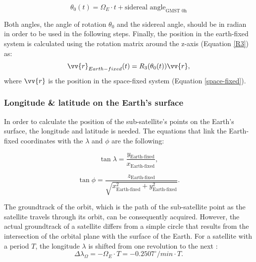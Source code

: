 
\begin{equation}
\label{theta_angle}
\theta_{0}(t) = \Omega_{E} \cdot t + \text{sidereal angle}_{\text{GMST 0h}}
\end{equation}

Both angles, the angle of rotation $\theta_{0}$ and the sidereal angle, should be in radian in order to be used in the following steps. Finally, the position in the earth-fixed system is calculated using the rotation matrix around the z-axis (Equation \ref{R3}) as:
\begin{equation}
\vv{r}_{Earth-fixed}(t) = R_{3}(\theta_{0}(t)) \vv{r},
\end{equation}
where $\vv{r}$ is the position in the space-fixed system (Equation \ref{space-fixed}).

\bigskip
\subsubsection{Longitude \& latitude on the Earth's surface}
\bigskip

In order to calculate the position of the sub-satellite's points on the Earth's surface, the longitude and latitude is needed. The equations that link the Earth-fixed coordinates with the $\lambda$ and $\phi$ are the following:

\begin{equation}
\tan{\lambda} = \frac{y_{\text{Earth-fixed}}}{x_{\text{Earth-fixed}}},
\end{equation}

\begin{equation}
\tan{\phi} = \frac{z_{\text{Earth-fixed}}}{\sqrt{x^2_{\text{Earth-fixed}} + y^2_{\text{Earth-fixed}}}}.
\end{equation}

The groundtrack of the orbit, which is the path of the sub-satellite point as the satellite travels through its orbit, can be consequently acquired. However, the actual groundtrack of a satellite differs from a simple circle that results from the intersection of the orbital plane with the surface of the Earth. For a satellite with a period $T$, the longitude $\lambda$ is shifted from one revolution to the next \cite{Montenbruck} :
\begin{equation}
\Delta \lambda_{\Omega} = - \Omega_{E} \cdot T = - 0.2507^{\circ}/ min \cdot T.
\end{equation}

